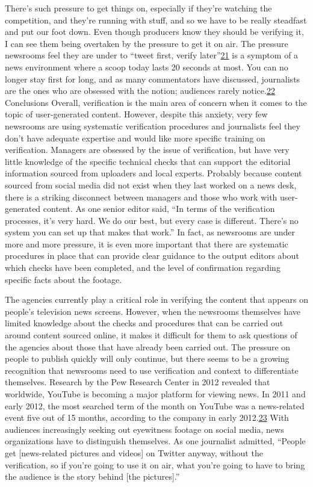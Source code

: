 \documentclass[symmetric, notoc, nobib]{towcenter-book}
\begin{document}
There's such pressure to get things on, especially if they're watching
the competition, and they're running with stuff, and so we have to be
really steadfast and put our foot down. Even though producers know
they should be verifying it, I can see them being overtaken by the
pressure to get it on air.
The pressure newsrooms feel they are under to ``tweet first, verify later''{\href{#endnotes}{21}}
is a symptom of a news environment where a scoop today lasts 20 seconds
at most. You can no longer stay first for long, and as many commentators
have discussed, journalists are the ones who are obsessed with the notion;
audiences rarely notice.{\href{#endnotes}{22}}
Conclusions
Overall, verification is the main area of concern when it comes to the topic of
user-generated content. However, despite this anxiety, very few newsrooms
are using systematic verification procedures and journalists feel they don't
have adequate expertise and would like more specific training on verification.
Managers are obsessed by the issue of verification, but have very little
knowledge of the specific technical checks that can support the editorial
information sourced from uploaders and local experts. Probably because
content sourced from social media did not exist when they last worked on a
news desk, there is a striking disconnect between managers and those who
work with user-generated content.
As one senior editor said, ``In terms of the verification processes, it's very
hard. We do our best, but every case is different. There's no system you can
set up that makes that work.''
In fact, as newsrooms are under more and more pressure, it is even more
important that there are systematic procedures in place that can provide clear
guidance to the output editors about which checks have been completed, and
the level of confirmation regarding specific facts about the footage.

The agencies currently play a critical role in verifying the content that
appears on people's television news screens. However, when the newsrooms
themselves have limited knowledge about the checks and procedures that
can be carried out around content sourced online, it makes it difficult for
them to ask questions of the agencies about those that have already been
carried out.
The pressure on people to publish quickly will only continue, but there
seems to be a growing recognition that newsrooms need to use verification
and context to differentiate themselves. Research by the Pew Research
Center in 2012 revealed that worldwide, YouTube is becoming a major platform
for viewing news. In 2011 and early 2012, the most searched term of
the month on YouTube was a news-related event five out of 15 months,
according to the company in early 2012.{\href{#endnotes}{23}} With audiences increasingly seeking
out eyewitness footage on social media, news organizations have to distinguish
themselves. As one journalist admitted, ``People get [news-related
pictures and videos] on Twitter anyway, without the verification, so if you're
going to use it on air, what you're going to have to bring the audience is the
story behind [the pictures].''
\end{document}
